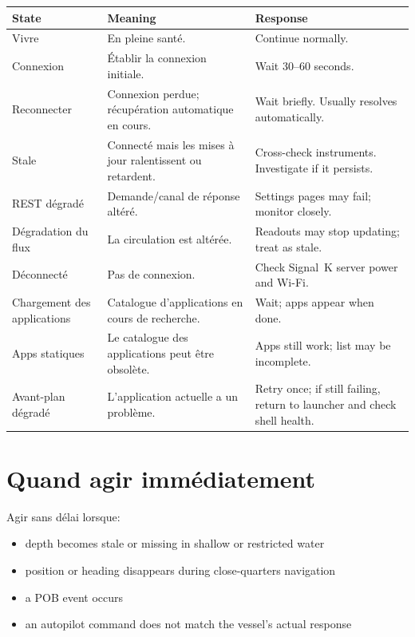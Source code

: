 \begin{longtable}{L{3.2cm}L{4.8cm}L{5.7cm}}
\toprule
{}
\color{white}\sffamily\bfseries State &
\color{white}\sffamily\bfseries Meaning &
\color{white}\sffamily\bfseries Response \\
\midrule
Vivre&En pleine santé.&
  Continue normally. \\
Connexion&Établir la connexion initiale.&
  Wait 30--60 seconds. \\
Reconnecter&Connexion perdue; récupération automatique en cours.&
  Wait briefly. Usually resolves automatically. \\
Stale&Connecté mais les mises à jour ralentissent ou retardent.&
  Cross-check instruments. Investigate if it persists. \\
REST dégradé&Demande/canal de réponse altéré.&
  Settings pages may fail; monitor closely. \\
Dégradation du flux&La circulation est altérée.&
  Readouts may stop updating; treat as stale. \\
Déconnecté&Pas de connexion.&
  Check Signal~K server power and Wi-Fi. \\
Chargement des applications&Catalogue d'applications en cours de recherche.&
  Wait; apps appear when done. \\
Apps statiques&Le catalogue des applications peut être obsolète.&
  Apps still work; list may be incomplete. \\
Avant-plan dégradé&L'application actuelle a un problème.&
  Retry once; if still failing, return to launcher and check shell health. \\
\bottomrule
\end{longtable}

\section{Quand agir immédiatement}

Agir sans délai lorsque:

\begin{itemize}
  \item depth becomes stale or missing in shallow or restricted water
  \item position or heading disappears during close-quarters navigation
  \item a POB event occurs
  \item an autopilot command does not match the vessel's actual response
\end{itemize}

